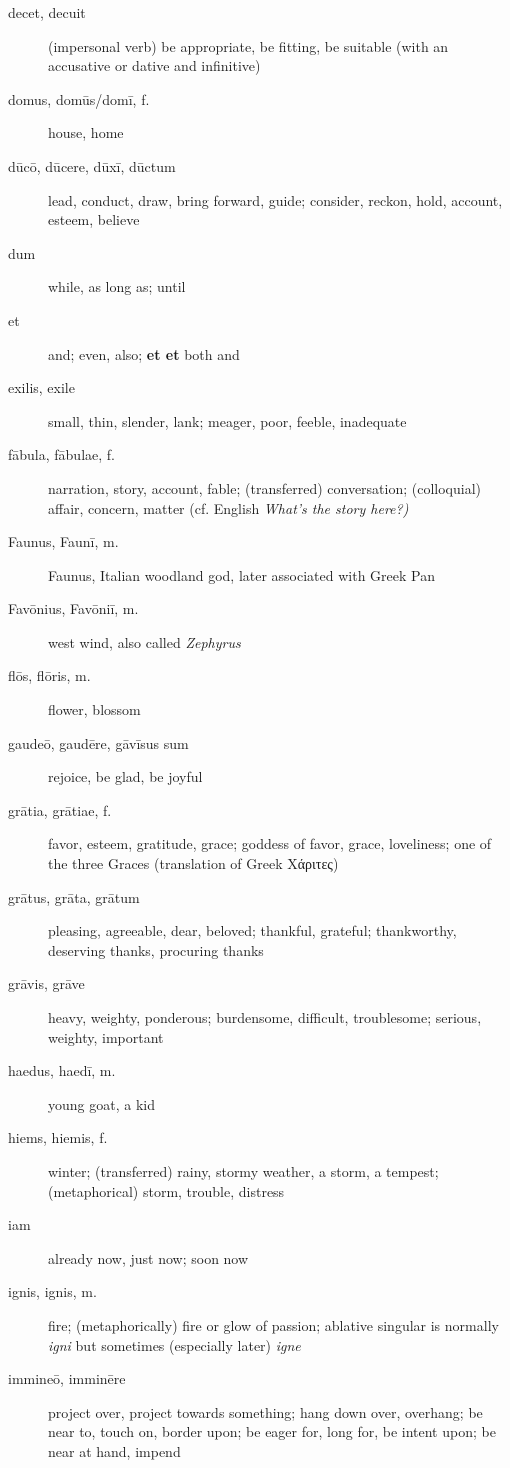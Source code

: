 \begin{description}
    \item[decet, decuit] (impersonal verb) be appropriate, be fitting, be
        suitable (with an accusative or dative and infinitive)
    \item[domus, domūs/domī, f.] house, home
    \item[dūcō, dūcere, dūxī, dūctum] lead, conduct, draw, bring forward, guide; consider, reckon, hold, account, esteem, believe
    \item[dum] while, as long as; until
    \item[et] and; even, also; \textbf{et \lips et} both \lips and
    \item[exilis, exile] small, thin, slender, lank; meager, poor, feeble, inadequate
    \item[fābula, fābulae, f.] narration, story, account, fable; (transferred) conversation; (colloquial) affair, concern, matter (cf. English \textit{What's the story here?)}
    \item[Faunus, Faunī, m.] Faunus, Italian woodland god, later associated with Greek Pan
    \item[Favōnius, Favōniī, m.] west wind, also called \textit{Zephyrus}
    \item[flōs, flōris, m.] flower, blossom
    \item[gaudeō, gaudēre, gāvīsus sum] rejoice, be glad, be joyful
    \item[grātia, grātiae, f.] favor, esteem, gratitude, grace; goddess of favor, grace, loveliness; one of the three Graces (translation of Greek Χάριτες)
    \item[grātus, grāta, grātum] pleasing, agreeable, dear, beloved; thankful, grateful; thankworthy, deserving thanks, procuring thanks
    \item[grāvis, grāve] heavy, weighty, ponderous; burdensome, difficult, troublesome; serious, weighty, important
    \item[haedus, haedī, m.] young goat, a kid
    \item[hiems, hiemis, f.] winter; (transferred) rainy, stormy weather, a storm, a tempest; (metaphorical) storm, trouble, distress 
    \item[iam] already now, just now; soon now
    \item[ignis, ignis, m.] fire; (metaphorically) fire or glow of passion; ablative singular is normally \textit{igni} but sometimes (especially later) \textit{igne} 
    \item[immineō, imminēre] project over, project towards something; hang down over, overhang; be near to, touch on, border upon; be eager for, long for, be intent upon; be near at hand, impend

\end{description}
